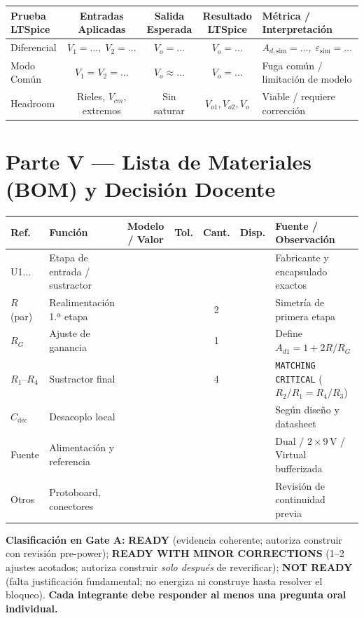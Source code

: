 \documentclass[10pt, a4paper]{article}
\begin{document}
\begin{table}[htbp]
    \centering
    \footnotesize
    \renewcommand{\arraystretch}{1.3}
    \begin{tabularx}{\textwidth}{|l|c|c|c|>{\raggedright\arraybackslash}X|}
    \hline
    \rowcolor[HTML]{EFEFEF} 
    \textbf{Prueba LTSpice} & \textbf{Entradas Aplicadas} & \textbf{Salida Esperada} & \textbf{Resultado LTSpice} & \textbf{Métrica / Interpretación} \\ \hline
    Diferencial & $V_1=\dots,\; V_2=\dots$ & $V_o=\dots$ & $V_o=\dots$ & $A_{d,\mathrm{sim}}=\dots,\; \varepsilon_{\mathrm{sim}}=\dots$ \\ \hline
    Modo Común & $V_1=V_2=\dots$ & $V_o\approx\dots$ & $V_o=\dots$ & Fuga común / limitación de modelo \\ \hline
    Headroom & Rieles, $V_{cm}$, extremos & Sin saturar & $V_{o1}, V_{o2}, V_o$ & Viable / requiere corrección \\ \hline
    \end{tabularx}
\end{table}

\section*{Parte V — Lista de Materiales (BOM) y Decisión Docente}
\begin{table}[htbp]
    \centering
    \footnotesize
    \renewcommand{\arraystretch}{1.28}
    \begin{tabularx}{\textwidth}{|l|l|c|c|c|c|>{\raggedright\arraybackslash}X|}
    \hline
    \rowcolor[HTML]{EFEFEF} 
    \textbf{Ref.} & \textbf{Función} & \textbf{Modelo / Valor} & \textbf{Tol.} & \textbf{Cant.} & \textbf{Disp.} & \textbf{Fuente / Observación} \\ \hline
    U1$\dots$ & Etapa de entrada / sustractor & & & & & Fabricante y encapsulado exactos \\ \hline
    $R$ (par) & Realimentación 1.ª etapa & & & 2 & & Simetría de primera etapa \\ \hline
    $R_G$ & Ajuste de ganancia & & & 1 & & Define $A_{d1} = 1 + 2R/R_G$ \\ \hline
    $R_1\text{--}R_4$ & Sustractor final & & & 4 & & \texttt{MATCHING CRITICAL} ($R_2/R_1 = R_4/R_3$) \\ \hline
    $C_{\mathrm{dec}}$ & Desacoplo local & & & & & Según diseño y datasheet \\ \hline
    Fuente & Alimentación y referencia & & & & & Dual / $2\times 9\,\text{V}$ / Virtual bufferizada \\ \hline
    Otros & Protoboard, conectores & & & & & Revisión de continuidad previa \\ \hline
    \end{tabularx}
\end{table}
\noindent\textbf{Clasificación en Gate A:} \textbf{READY} (evidencia coherente; autoriza construir con revisión pre-power); \textbf{READY WITH MINOR CORRECTIONS} (1–2 ajustes acotados; autoriza construir \textit{solo después} de reverificar); \textbf{NOT READY} (falta justificación fundamental; no energiza ni construye hasta resolver el bloqueo). \textbf{Cada integrante debe responder al menos una pregunta oral individual.}
\end{document}
